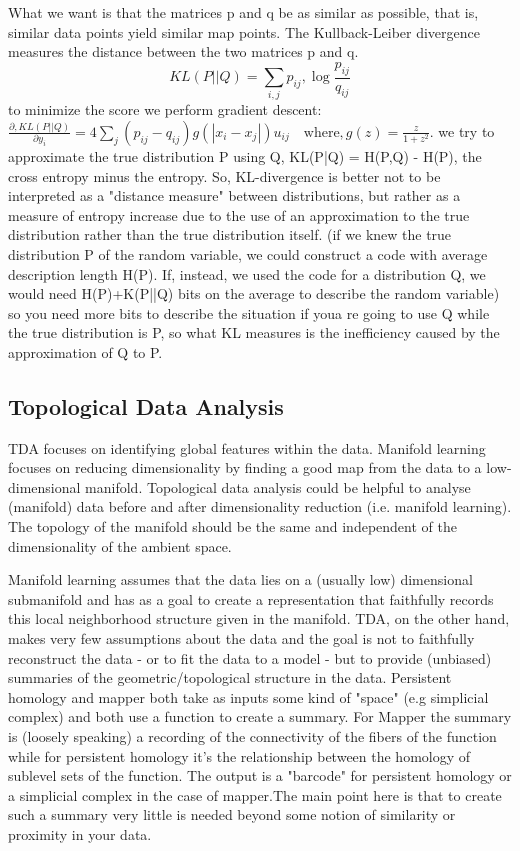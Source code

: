 \documentclass[11pt]{article}
\begin{document}
What we want is that the matrices p and q be as similar as possible, that is, similar data points yield similar map points.
The Kullback-Leiber divergence measures the distance between the two matrices p and q. 
\begin{equation}
KL(P||Q) = \sum_{i, j} p_{ij} , \log \frac{p_{ij}}{q_{ij}}
\end{equation}
to minimize the score we perform gradient descent:
\(\frac{\partial , KL(P || Q)}{\partial y_i} = 4 \sum_j (p_{ij} - q_{ij}) g\left( \left| x_i - x_j\right| \right) u_{ij} \quad \textrm{where} , g(z) = \frac{z}{1+z^2}.\)
we try to approximate the true distribution P using Q, KL(P|Q) = H(P,Q) - H(P), the cross entropy minus the entropy.
So, KL-divergence is better not to be interpreted as a "distance measure" between distributions, but rather as a measure of entropy increase due to the use of an approximation to the true distribution rather than the true distribution itself. (if we knew the true distribution P of the random variable, we could construct a code with average description length H(P). If, instead, we used the code for a distribution Q, we would need H(P)+K(P||Q) bits on the average to describe the random variable) so you need more bits to describe the situation if youa re going to use Q while the true distribution is P, so what KL measures is the inefficiency caused by the approximation of Q to P.

\subsection{Topological Data Analysis}
TDA focuses on identifying global features within the data.
Manifold learning focuses on reducing dimensionality by finding a good map from the data to a low-dimensional manifold. Topological data analysis could be helpful to analyse (manifold) data before and after dimensionality reduction (i.e. manifold learning). The topology of the manifold should be the same and independent of the dimensionality of the ambient space.

Manifold learning assumes that the data lies on a (usually low) dimensional submanifold and has as a goal to create a representation that faithfully records this local neighborhood structure given in the manifold. 
TDA, on the other hand, makes very few assumptions about the data and the goal is not to faithfully reconstruct the data - or to fit the data to a model - but to provide (unbiased) summaries of the geometric/topological structure in the data.
Persistent homology and mapper both take as inputs some kind of "space" (e.g simplicial complex) and both use a function to create a summary. For Mapper the summary is (loosely speaking) a recording of the connectivity of the fibers of the  function while for persistent homology it's the relationship between the homology of sublevel sets of the function. The output is a "barcode" for persistent homology or a simplicial complex in the case of mapper.The main point here is that to create such a summary very little is needed beyond some notion of similarity or proximity in your data.
\end{document}
